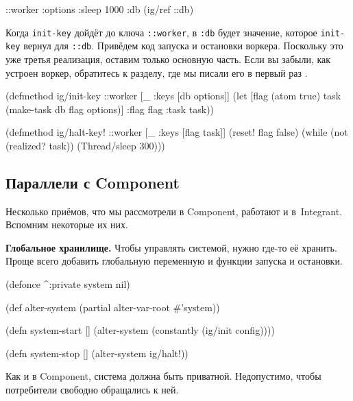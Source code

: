 \begin{english}
  \begin{clojure}
{::worker {:options {:sleep 1000}
           :db (ig/ref ::db)}}
  \end{clojure}
\end{english}

Когда \verb|init-key| дойдёт до ключа \verb|::worker|, в \verb|:db| будет
значение, которое \verb|init-key| вернул для \verb|::db|. Привёдем код
запуска и остановки воркера. Поскольку это уже третья реализация, оставим только
основную часть. Если вы забыли, как устроен воркер, обратитесь к разделу, где мы
писали его в первый раз .

\begin{english}
  \begin{clojure}
(defmethod ig/init-key ::worker
  [_ {:keys [db options]}]
  (let [flag (atom true)
        task (make-task db flag options)]
    {:flag flag :task task}))

(defmethod ig/halt-key! ::worker
  [_ {:keys [flag task]}]
  (reset! flag false)
  (while (not (realized? task))
    (Thread/sleep 300)))
  \end{clojure}
\end{english}

\subsection{Параллели с Component}

Несколько приёмов, что мы рассмотрели в Component, работают и
в~Integrant. Вспомним некоторые их них.


\textbf{Глобальное хранилище.} Чтобы управлять системой, нужно где-то её
хранить. Проще всего добавить глобальную переменную и функции запуска и
остановки.

\begin{english}
  \begin{clojure}
(defonce ^:private system nil)

(def alter-system (partial alter-var-root #'system))

(defn system-start []
  (alter-system (constantly (ig/init config))))

(defn system-stop []
  (alter-system ig/halt!))
  \end{clojure}
\end{english}

Как и в Component, система должна быть приватной. Недопустимо, чтобы потребители
свободно обращались к ней.

